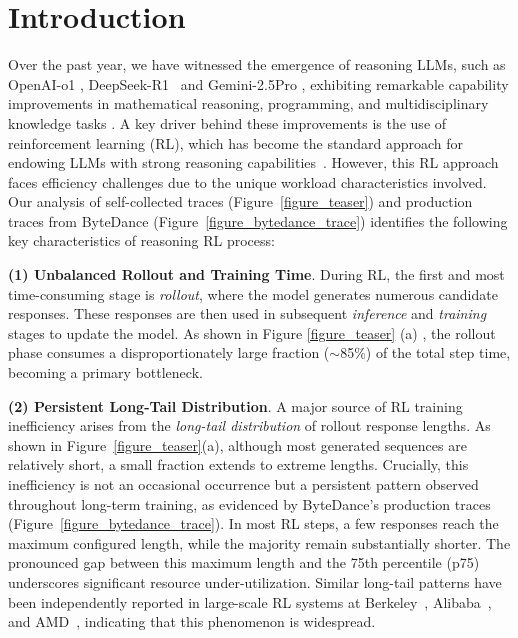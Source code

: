 \documentclass[sigplan,screen]{acmart}
\begin{document}
\section{Introduction}
\label{sec_intro}

Over the past year, we have witnessed the emergence of reasoning LLMs, such as OpenAI-o1 \cite{O1}, DeepSeek-R1~\cite{DeepSeekR1} and Gemini-2.5Pro \cite{Gemini2.5Pro}, exhibiting remarkable capability improvements in mathematical reasoning, programming, and multidisciplinary knowledge tasks \cite{ReasoningSurvey}. A key driver behind these improvements is the use of reinforcement learning (RL), which has become the standard approach for endowing LLMs with strong reasoning capabilities~\cite{DeepSeekMath,QwQ,DeepSeekR1,DAPO}. However, this RL approach faces efficiency challenges due to the unique workload characteristics involved. Our analysis of self-collected traces (Figure~\ref{figure_teaser}) and  production traces from ByteDance (Figure~\ref{figure_bytedance_trace}) identifies the following key characteristics of reasoning RL process:

\noindent\textbf{(1) Unbalanced Rollout and Training Time}.
During RL, the first and most time-consuming stage is \emph{rollout}, where the model generates numerous candidate responses. These responses are then used in subsequent \emph{inference} and \emph{training} stages to update the model.
As shown in Figure \ref{figure_teaser} (a) , the rollout phase consumes a disproportionately large fraction ($\sim$85\%) of the total step time, becoming a primary bottleneck. 



\noindent\textbf{(2) Persistent Long-Tail Distribution}.
A major source of RL training inefficiency arises from the \emph{long-tail distribution} of rollout response lengths. As shown in Figure~\ref{figure_teaser}(a), although most generated sequences are relatively short, a small fraction extends to extreme lengths. Crucially, this inefficiency is not an occasional occurrence but a persistent pattern observed throughout long-term training, as evidenced by ByteDance's production traces (Figure~\ref{figure_bytedance_trace}). In most RL steps, a few responses reach the maximum configured length, while the majority remain substantially shorter. The pronounced gap between this maximum length and the 75th percentile (p75) underscores significant resource under-utilization. 
Similar long-tail patterns have been independently reported in large-scale RL systems at Berkeley~\cite{deepscalerTrace}, Alibaba~\cite{gao2025rollpacker}, and AMD~\cite{zhou2025april}, indicating that this phenomenon is widespread.
\end{document}
